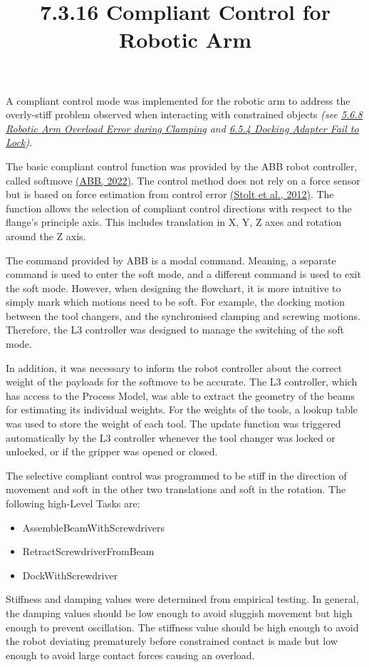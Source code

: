 \documentclass[11pt]{book}
\title{7.3.16 Compliant Control for Robotic Arm}
\begin{document}
\maketitle

A compliant control mode was implemented for the robotic arm to address the overly-stiff problem observed when interacting with constrained objects \textit{(see \uline{5.6.8 Robotic Arm Overload Error during Clamping} and \uline{6.5.4 Docking Adapter Fail to Lock})}.

The basic compliant control function was provided by the ABB robot controller, called softmove \href{https://www.zotero.org/google-docs/?dAIuOB}{(ABB, 2022)}. The control method does not rely on a force sensor but is based on force estimation from control error \href{https://www.zotero.org/google-docs/?MEuihf}{(Stolt et al., 2012)}. The function allows the selection of compliant control directions with respect to the flange’s principle axis. This includes translation in X, Y, Z axes and rotation around the Z axis. 

The command provided by ABB is a modal command. Meaning, a separate command is used to enter the soft mode, and a different command is used to exit the soft mode. However, when designing the flowchart, it is more intuitive to simply mark which motions need to be soft. For example, the docking motion between the tool changers, and the synchronised clamping and screwing motions. Therefore, the L3 controller was designed to manage the switching of the soft mode. 

In addition, it was necessary to inform the robot controller about the correct weight of the payloads for the softmove to be accurate. The L3 controller, which has access to the Process Model, was able to extract the geometry of the beams for estimating its individual weights. For the weights of the tools, a lookup table was used to store the weight of each tool. The update function was triggered automatically by the L3 controller whenever the tool changer was locked or unlocked, or if the gripper was opened or closed. 

The selective compliant control was programmed to be stiff in the direction of movement and soft in the other two translations and soft in the rotation. The following high-Level Tasks are: 

\begin{itemize}
	\item AssembleBeamWithScrewdrivers

	\item RetractScrewdriverFromBeam

	\item DockWithScrewdriver

\end{itemize}
Stiffness and damping values were determined from empirical testing. In general, the damping values should be low enough to avoid sluggish movement but high enough to prevent oscillation. The stiffness value should be high enough to avoid the robot deviating prematurely before constrained contact is made but low enough to avoid large contact forces causing an overload. 
\end{document}
